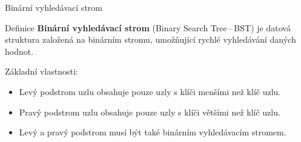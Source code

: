 \documentclass[10pt]{beamer}
\begin{document}
\begin{frame}[t]{Binární vyhledávací strom}
    \smallskip
    \begin{block}{Definice}
    \medskip
    \textbf{Binární vyhledávací strom} (Binary Search Tree\,--\,BST) je datová struktura založená na binárním stromu, umožňující rychlé vyhledávání daných hodnot.
    \end{block}
    \medskip
    Základní vlastnosti:
    \begin{itemize}
        \item Levý podstrom uzlu obsahuje pouze uzly s klíči menšími než klíč uzlu.
        \item Pravý podstrom uzlu obsahuje pouze uzly s klíči většími než klíč uzlu.
        \item Levý a pravý podstrom musí být také binárním vyhledávacím stromem.
    \end{itemize}
\end{frame}
\end{document}
